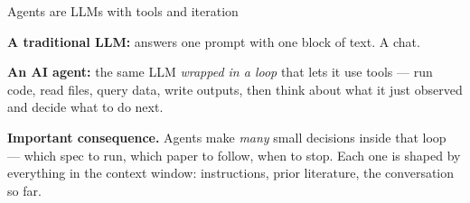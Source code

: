 \documentclass[aspectratio=169,12pt,t]{beamer}
\begin{document}
\begin{frame}{Agents are LLMs with tools and iteration}
\vspace{0.4cm}

\textbf{A traditional LLM:} answers one prompt with one block of text. \;A chat.

\vspace{0.5cm}

\textbf{An AI agent:} the same LLM \textit{wrapped in a loop} that lets it use tools --- run code, read files, query data, write outputs, then think about what it just observed and decide what to do next.

\vspace{0.5cm}

\textbf{Important consequence.} \;Agents make \textit{many} small decisions inside that loop --- which spec to run, which paper to follow, when to stop. \;Each one is shaped by everything in the context window: instructions, prior literature, the conversation so far.

\vspace{0.5em}
\end{frame}
\end{document}
